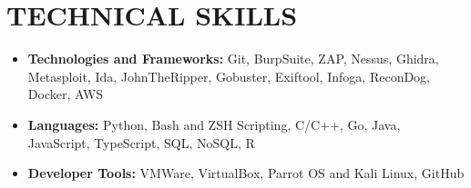 \documentclass[letterpaper,11pt]{article}
\newcommand{\resumeItem}[1]{
  \item\small{
    {#1 \vspace{-2pt}}
  }
}
\newcommand{\resumeItemListStart}{\begin{itemize}}
\newcommand{\resumeItemListEnd}{\end{itemize}\vspace{-5pt}}
\begin{document}
\section{TECHNICAL SKILLS}
     \vspace{2.5pt}
     \begin{itemize}[leftmargin=0in, label={}]
         \small{\item{
         \resumeItemListStart
            \resumeItem{\textbf{\normalsize{Technologies and Frameworks:}}{ \normalsize{Git, BurpSuite, ZAP, Nessus, Ghidra, Metasploit, Ida, JohnTheRipper, Gobuster, Exiftool, Infoga, ReconDog, Docker, AWS}}} \vspace{2.5pt} \\
            
            \resumeItem{\textbf{\normalsize{Languages:}}{ \normalsize{Python, Bash and ZSH Scripting, C/C++, Go, Java, JavaScript, TypeScript, SQL, NoSQL, R}}} \vspace{2.5pt} \\
            
             \resumeItem{\textbf{\normalsize{Developer Tools:}}{ \normalsize{VMWare, VirtualBox, Parrot OS and Kali Linux, GitHub}}} \vspace{2.5pt} \\
            
        \resumeItemListEnd
     }}
     \end{itemize}



\end{document}
